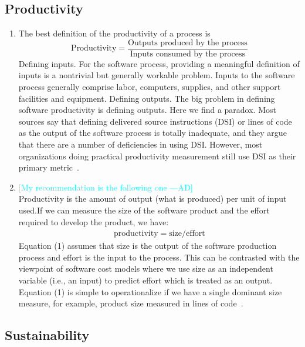 \documentclass[letterpaper,cleveref]{lipics-v2019}
\newcommand{\authornote}[3]{\textcolor{#1}{[#3 ---#2]}}
\newcommand{\authornote}[3]{}
\newcommand{\ad}[1]{\authornote{cyan}{AD}{#1}} %
\theoremstyle{definition}
\begin{document}
\subsection{Productivity}
\begin{enumerate}[(1).]
    \item
    
    The best definition of the productivity of a process is
    \[\text{Productivity} = \dfrac{\text{Outputs produced by the
          process}}{\text{Inputs consumed by the process}}\]
    Defining inputs. For the software process, providing a meaningful definition
    of inputs is a nontrivial but generally workable problem. Inputs to the software process generally comprise labor, computers, supplies, and other support facilities and equipment. Defining outputs. The big problem in
    defining software productivity is defining outputs. Here we find a
    paradox. Most sources say that defining delivered source instructions (DSI)
    or lines of code as the output of the software process is totally
    inadequate, and they argue that there are a number of deficiencies in using
    DSI. However, most organizations doing practical productivity measurement
    still use DSI as their primary metric~\cite{Boehm1987}.

    \item \ad{My recommendation is the following one}\\
    Productivity is the amount of output (what is produced) per unit of input used.If we can measure the size of the software product and the effort required to develop the product, we have:
    \begin{align}
        \text{productivity} = \text{size}/\text{effort}
    \end{align}
    Equation (1) assumes that size is the output of the software production
    process and effort is the input to the process. This can be contrasted with
    the viewpoint of software cost models where we use size as an independent
    variable (i.e., an input) to predict effort which is treated as an
    output. Equation (1) is simple to operationalize if we have a single
    dominant size measure, for example, product size measured in lines of
    code~\cite{Kitchenham2004}.
\end{enumerate}

\subsection{Sustainability}
\end{document}
